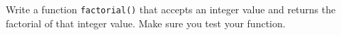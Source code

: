 Write a function \texttt{factorial()} that accepts an integer value and returns the factorial of that integer value. Make sure you test your function.

